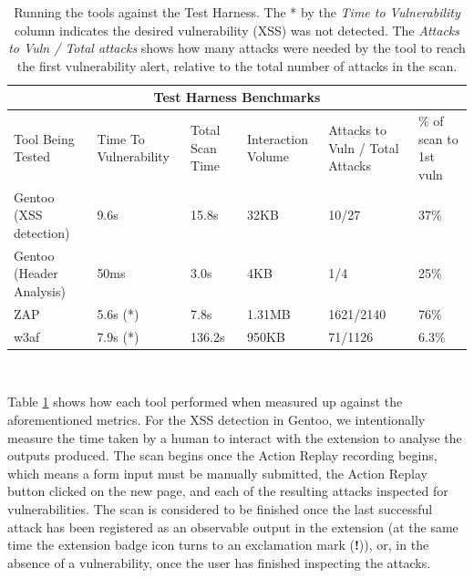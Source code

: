 \begin{table}[h]
	
{

	   \captionsetup{justification=centering}
	
	\caption{Running the tools against the Test Harness. The * by the \textit{Time to Vulnerability} column indicates the desired vulnerability (XSS) was not detected. The \textit{Attacks to Vuln / Total attacks} shows how many attacks were needed by the tool to reach the first vulnerability alert, relative to the total number of attacks in the scan.}
		\label{table:test_harness_benchmarks}
\begin{tabular}{ |p{4cm}||p{1.4cm}|p{1.4cm}|p{1.6cm}|p{2cm}|p{2cm}| }
	\hline
	\multicolumn{6}{|c|}{\textbf{Test Harness Benchmarks}} \\ [0.5ex]
	\hline \hline 
	Tool Being Tested& Time To Vulnerability & Total Scan Time & Interaction Volume & Attacks to Vuln / Total Attacks & \% of scan to 1st vuln \\
	\hline
	Gentoo (XSS detection)    & 9.6s      & 15.8s    & 32KB & 10/27 &37\% \\
	Gentoo (Header Analysis) & 50ms    &  3.0s    & 4KB&  1/4 &25\%\\
	ZAP                                   & 5.6s (*) & 7.8s      &  1.31MB &1621/2140 &76\%\\ 
	w3af                                 & 7.9s  (*) & 136.2s & 950KB & 71/1126 &6.3\%\\
	\hline
\end{tabular}
} \\
\end{table}

Table \ref{table:test_harness_benchmarks} shows how each tool performed when measured up against the aforementioned metrics. For the XSS detection in Gentoo, we intentionally measure the time taken by a human to interact with the extension to analyse the outputs produced. The scan begins once the Action Replay recording begins, which means a form input must be manually submitted, the Action Replay button clicked on the new page, and each of the resulting attacks inspected for vulnerabilities. The scan is considered to be finished once the last successful attack has been registered as an observable output in the extension (at the same time the extension badge icon turns to an exclamation mark (\textbf{!})), or, in the absence of a vulnerability, once the user has finished inspecting the attacks. \\

